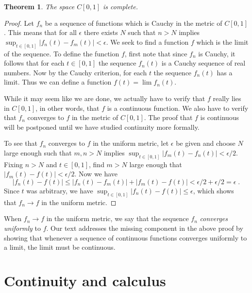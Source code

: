\documentclass[11pt,oneside]{amsbook}
\theoremstyle{definition}
\theoremstyle{plain}
\newtheorem{theorem}{Theorem}[section]
\theoremstyle{definition}
\theoremstyle{remark}
\numberwithin{equation}{section}
\numberwithin{figure}{section}
\begin{document}
\begin{theorem}
  The space $C[0,1]$ is complete.
\end{theorem}

\begin{proof}
  Let $f_n$ be a sequence of functions which is Cauchy in the metric of $C[0,1]$. This means that for all $\epsilon$ there exists $N$ such that $n>N$ implies $\sup_{t\in[0,1]}|f_n(t)-f_m(t)|<\epsilon$. We seek to find a function $f$ which is the limit of the sequence. To define the function $f$, first note that since $f_n$ is Cauchy, it follows that for each $t\in[0,1]$ the sequence $f_n(t)$ is a Cauchy sequence of real numbers. Now by the Cauchy criterion, for each $t$ the sequence $f_n(t)$ has a limit. Thus we can define a function $f(t)=\lim f_n(t)$.

  While it may seem like we are done, we actually have to verify that $f$ really lies in $C[0,1]$, in other words, that $f$ is a continuous function. We also have to verify that $f_n$ converges to $f$ in the metric of $C[0,1]$. The proof that $f$ is continuous will be postponed until we have studied continuity more formally.

  To see that $f_n$ converges to $f$ in the uniform metric, let $\epsilon$ be given and choose $N$ large enough such that $m,n>N$ implies $\sup_{t\in[0,1]}|f_m(t)-f_n(t)|<\epsilon/2$. Fixing $n>N$ and $t\in[0,1]$, find $m>N$ large enough that $|f_m(t)-f(t)|<\epsilon/2$. Now we have
\[|f_n(t)-f(t)|\leq|f_n(t)-f_m(t)|+|f_m(t)-f(t)|<\epsilon/2+\epsilon/2=\epsilon\;.
\]
Since $t$ was arbitrary, we have $\sup_{t\in[0,1]}|f_n(t)-f(t)|\leq\epsilon$, which shows that $f_n\to f$ in the uniform metric.
\end{proof}

When $f_n\to f$ in the uniform metric, we say that the sequence $f_n$ \emph{converges uniformly} to $f$. Our text addresses the missing component in the above proof by showing that whenever a sequence of continuous functions converges uniformly to a limit, the limit must be continuous.


\chapter{Continuity and calculus}

\end{document}
